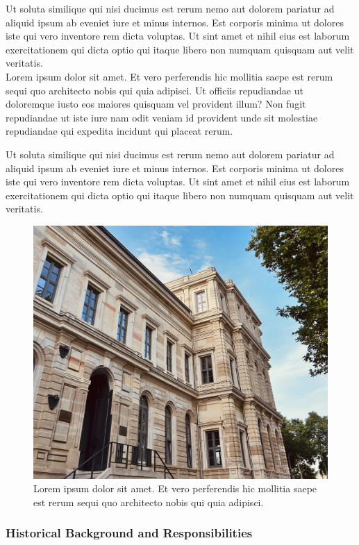 \documentclass[12pt]{article}
\begin{document}
Ut soluta similique qui nisi ducimus est rerum nemo aut dolorem pariatur ad aliquid ipsum ab eveniet iure et minus internos. Est corporis minima ut dolores iste qui vero inventore rem dicta voluptas. Ut sint amet et nihil eius est laborum exercitationem qui dicta optio qui itaque libero non numquam quisquam aut velit veritatis.\\

\noindent Lorem ipsum dolor sit amet. Et vero perferendis hic mollitia saepe est rerum sequi quo architecto nobis qui quia adipisci. Ut officiis repudiandae ut doloremque iusto eos maiores quisquam vel provident illum? Non fugit repudiandae ut iste iure nam odit veniam id provident unde sit molestiae repudiandae qui expedita incidunt qui placeat rerum.

Ut soluta similique qui nisi ducimus est rerum nemo aut dolorem pariatur ad aliquid ipsum ab eveniet iure et minus internos. Est corporis minima ut dolores iste qui vero inventore rem dicta voluptas. Ut sint amet et nihil eius est laborum exercitationem qui dicta optio qui itaque libero non numquam quisquam aut velit veritatis.\\

\begin{figure}[ht]
\centering
\includegraphics[width=0.8\linewidth]{figures/itu_example_photo.jpg}
\caption{Lorem ipsum dolor sit amet. Et vero perferendis hic mollitia saepe est rerum sequi quo architecto nobis qui quia adipisci.}
\end{figure}

\subsubsection{Historical Background and Responsibilities}
\end{document}
